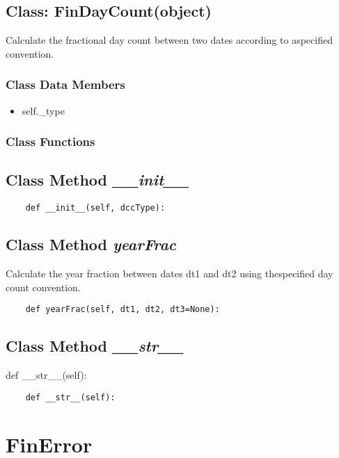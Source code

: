 \documentclass[twoside,11pt]{book}
\begin{document}
\subsection{Class: FinDayCount(object)}
Calculate the fractional day count between two dates according to aspecified convention. 

\subsubsection{Class Data Members}
\begin{itemize}
\item{self.\_type}
\end{itemize}

\subsubsection{Class Functions}

\subsection{Class Method {\it \_\_init\_\_}}


\begin{lstlisting}
    def __init__(self, dccType):
\end{lstlisting}

\subsection{Class Method {\it yearFrac}}
Calculate the year fraction between dates dt1 and dt2 using thespecified day count convention. 

\begin{lstlisting}
    def yearFrac(self, dt1, dt2, dt3=None):
\end{lstlisting}

\subsection{Class Method {\it \_\_str\_\_}}
def \_\_str\_\_(self):

\begin{lstlisting}
    def __str__(self):
\end{lstlisting}

\newpage
\section{FinError}
\end{document}
